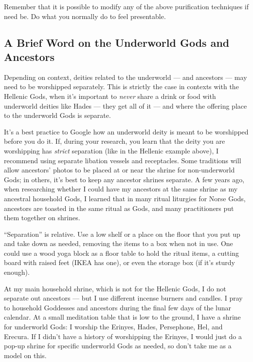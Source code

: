 \documentclass[
]{book}
\begin{document}
Remember that it is possible to modify any of the above purification techniques if need be. Do what you normally do to feel presentable.

\hypertarget{underworld}{%
\subsection{A Brief Word on the Underworld Gods and Ancestors}\label{underworld}}

Depending on context, deities related to the underworld --- and ancestors --- may need to be worshipped separately. This is strictly the case in contexts with the Hellenic Gods, when it's important to \emph{never} share a drink or food with underworld deities like Hades --- they get all of it --- and where the offering place to the underworld Gods is separate.

It's a best practice to Google how an underworld deity is meant to be worshipped before you do it. If, during your research, you learn that the deity you are worshipping has \emph{strict} separation (like in the Hellenic example above), I recommend using separate libation vessels and receptacles. Some traditions will allow ancestors' photos to be placed at or near the shrine for non-underworld Gods; in others, it's best to keep any ancestor shrines separate. A few years ago, when researching whether I could have my ancestors at the same shrine as my ancestral household Gods, I learned that in many ritual liturgies for Norse Gods, ancestors are toasted in the same ritual as Gods, and many practitioners put them together on shrines.

``Separation'' is relative. Use a low shelf or a place on the floor that you put up and take down as needed, removing the items to a box when not in use. One could use a wood yoga block as a floor table to hold the ritual items, a cutting board with raised feet (IKEA has one), or even the storage box (if it's sturdy enough).

At my main household shrine, which is not for the Hellenic Gods, I do not separate out ancestors --- but I use different incense burners and candles. I pray to household Goddesses and ancestors during the final few days of the lunar calendar. At a small meditation table that is low to the ground, I have a shrine for underworld Gods: I worship the Erinyes, Hades, Persephone, Hel, and Erecura. If I didn't have a history of worshipping the Erinyes, I would just do a pop-up shrine for specific underworld Gods as needed, so don't take me as a model on this.
\end{document}
